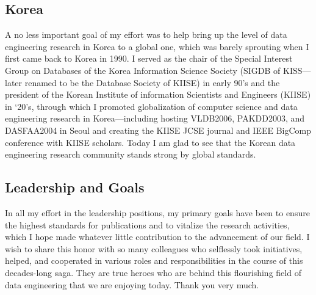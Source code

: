 \documentclass[11pt]{article}
\begin{document}
\subsection*{Korea}
A no less important goal of my effort was to help bring up the level of data engineering research in
Korea to a global one, which was barely sprouting when I first came back to Korea in 1990. I served
as the chair of the Special Interest Group on Databases of the Korea Information Science Society
(SIGDB of KISS—later renamed to be the Database Society of KIISE) in early 90’s and the president
of the Korean Institute of information Scientists and Engineers (KIISE) in ‘20’s, through which I
promoted globalization of computer science and data engineering research in Korea—including
hosting VLDB2006, PAKDD2003, and DASFAA2004 in Seoul and creating the KIISE JCSE journal
and IEEE BigComp conference with KIISE scholars. Today I am glad to see that the Korean data
engineering research community stands strong by global standards.

\subsection*{Leadership and Goals}
In all my effort in the leadership positions, my primary goals have been to ensure the highest
standards for publications and to vitalize the research activities, which I hope made whatever little
contribution to the advancement of our field.
I wish to share this honor with so many colleagues who selflessly took initiatives, helped, and
cooperated in various roles and responsibilities in the course of this decades-long saga. They are
true heroes who are behind this flourishing field of data engineering that we are enjoying today.
Thank you very much.
\end{document}
